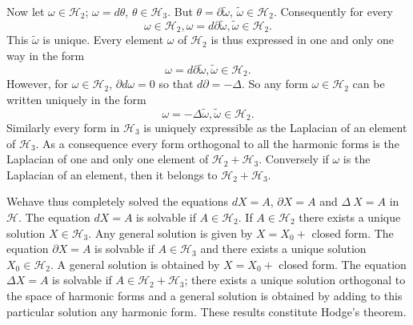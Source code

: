 Now let $\omega\in\mathscr{H}_{2}$; $\omega=d\theta$,
$\theta\in\mathscr{H}_{3}$. But $\theta=\partial\widetilde{\omega}$,
$\widetilde{\omega}\in\mathscr{H}_{2}$. Consequently for every
$$
\omega\in\mathscr{H}_{2},\omega=d\partial\widetilde{\omega},\widetilde{\omega}\in\mathscr{H}_{2}. 
$$
This $\widetilde{\omega}$ is unique. Every element $\omega$ of
$\mathscr{H}_{2}$ is thus expressed in one and only one way in the
form
$$
\omega=d\partial
\widetilde{\omega},\widetilde{\omega}\in\mathscr{H}_{2}.
$$
However, for $\omega\in \mathscr{H}_{2}$, $\partial d\omega=0$ so that
$d\partial =-\Delta$. So any form $\omega\in\mathscr{H}_{2}$ can be
written uniquely in the form
$$
\omega=-\Delta\widetilde{\omega},\widetilde{\omega}\in\mathscr{H}_{2}.
$$
Similarly every form in $\mathscr{H}_{3}$ is uniquely expressible as
the Laplacian of an element of $\mathscr{H}_{3}$. As a consequence
every form orthogonal to all the harmonic forms is the Laplacian of
one and only one element of
$\mathscr{H}_{2}+\mathscr{H}_{3}$. Conversely if $\omega$ is the
Laplacian of an element, then it belongs to
$\mathscr{H}_{2}+\mathscr{H}_{3}$. 

We\pageoriginale have thus completely solved the equations $dX=A$,
$\partial X=A$ and $\Delta ~X=A$ in $\mathscr{H}$. The equation $dX=A$
is solvable if 
$A\in\mathscr{H}_{2}$. If $A\in\mathscr{H}_{2}$ there exists a unique
solution $X\in\mathscr{H}_{3}$. Any general solution is given by
$X=X_{0}+$ closed form. The equation $\partial X=A$ is solvable if
$A\in\mathscr{H}_{3}$ and there exists a unique solution
$X_{0}\in\mathscr{H}_{2}$. A general solution is obtained by
$X=X_{0}+$ closed form. The equation $\Delta X=A$ is solvable if
$A\in\mathscr{H}_{2}+\mathscr{H}_{3}$; there exists a unique solution
orthogonal to the space of harmonic forms and a general solution is
obtained by adding to this particular solution any harmonic
form. These results constitute Hodge's theorem.


